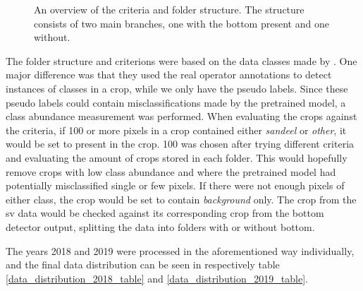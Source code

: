         
        \begin{figure}[H]
            \centering
            
            


            \caption[Criteria and folder structure]{An overview of the criteria and folder structure. The structure consists of two main branches, one with the bottom present and one without.}
            
            
          	\medskip 
            \label{data_hierarchy_fig}
        \end{figure}
        

        
        The folder structure and criterions were based on the data classes made by \citeauthor{brautaset2020acoustic}\cite{brautaset2020acoustic}. One major difference was that they used the real operator annotations to detect instances of classes in a crop, while we only have the pseudo labels. Since these pseudo labels could contain misclassifications made by the pretrained model, a class abundance measurement was performed. When evaluating the crops against the criteria, if 100 or more pixels in a crop contained either \textit{sandeel} or \textit{other}, it would be set to present in the crop. 100 was chosen after trying different criteria and evaluating the amount of crops stored in each folder. This would hopefully remove crops with low class abundance and where the pretrained model had potentially misclassified single or few pixels. If there were not enough pixels of either class, the crop would be set to contain \textit{background} only. The crop from the \gls{sv} data would be checked against its corresponding crop from the bottom detector output, splitting the data into folders with or without bottom.
        
        The years 2018 and 2019 were processed in the aforementioned way individually, and the final data distribution can be seen in respectively table \ref{data_distribution_2018_table} and \ref{data_distribution_2019_table}.



